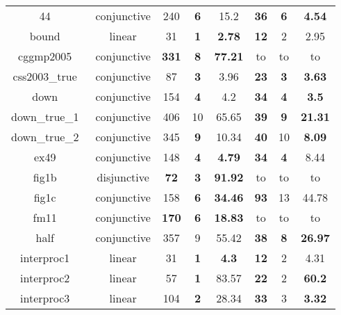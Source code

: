 \begin{table}[t]
\begin{tabular}{l c | c c c | c c c |}
\multicolumn{1}{|c|}{44~\cite{isil2013inductive}}				&conjunctive	&240	&\textbf{6} 		&15.2     			&\textbf{36}	&\textbf{6} &\textbf{4.54}  \\ 
\multicolumn{1}{|c|}{bound~\cite{gupta2009invgen}}				&linear 		&31 	&\textbf{1} 		&\textbf{2.78}    	&\textbf{12}	&2 			&2.95  \\ 
\multicolumn{1}{|c|}{cggmp2005~\cite{Dirk:SVCOMP:2016}}			&conjunctive	&\textbf{331}&\textbf{8}	&\textbf{77.21}		&to				&to			&to	\\
\multicolumn{1}{|c|}{css2003\_true~\cite{Dirk:SVCOMP:2016}}		&conjunctive	&87 	&\textbf{3} 		&3.96       		&\textbf{23}	&\textbf{3} &\textbf{3.63}  \\ 
\multicolumn{1}{|c|}{down~\cite{gupta2009invgen}}				&conjunctive	&154	&\textbf{4} 		&4.2      			&\textbf{34}	&\textbf{4}	&\textbf{3.5}  \\ 
\multicolumn{1}{|c|}{down\_true\_1~\cite{Dirk:SVCOMP:2016}}		&conjunctive 	&406	&10					&65.65    			&\textbf{39}	&\textbf{9} &\textbf{21.31}  \\ 
\multicolumn{1}{|c|}{down\_true\_2~\cite{Dirk:SVCOMP:2016}}		&conjunctive 	&345	&\textbf{9} 		&10.34    			&\textbf{40}	&10			&\textbf{8.09}  \\ 
\multicolumn{1}{|c|}{ex49~\cite{necla:benchmark}}				&conjunctive	&148	&\textbf{4} 		&\textbf{4.79}    	&\textbf{34}	&\textbf{4} &8.44  \\ 
\multicolumn{1}{|c|}{fig1b~\cite{zilu:repo}}					&disjunctive	&\textbf{72} &\textbf{3} 	&\textbf{91.92} 	&to 			&to 		&to 	\\
\multicolumn{1}{|c|}{fig1c~\cite{zilu:repo}}					&conjunctive	&158	&\textbf{6}			&\textbf{34.46}		&\textbf{93}	&13			&44.78  \\ 
\multicolumn{1}{|c|}{fm11~\cite{schwartznon}}					&conjunctive	&\textbf{170}	&\textbf{6} &\textbf{18.83}    	&to				&to			&to  \\ 
\multicolumn{1}{|c|}{half~\cite{gupta2009invgen}}				&conjunctive	&357	&9 					&55.42    			&\textbf{38}	&\textbf{8} &\textbf{26.97}  \\ 
\multicolumn{1}{|c|}{interproc1~\cite{jeannet2010interproc}}	&linear			&31 	&\textbf{1} 		&\textbf{4.3}     	&\textbf{12}	&2 			&4.31  \\ 
\multicolumn{1}{|c|}{interproc2~\cite{jeannet2010interproc}}	&linear 		&57 	&\textbf{1} 		&83.57      		&\textbf{22}	&2 			&\textbf{60.2}  \\ 
\multicolumn{1}{|c|}{interproc3~\cite{jeannet2010interproc}}	&linear			&104	&\textbf{2} 		&28.34    			&\textbf{33}	&3 			&\textbf{3.32}  \\ 

\end{tabular}
\end{table}
